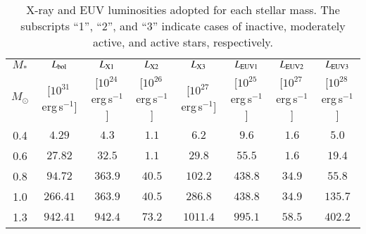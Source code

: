 \documentclass{aa}
\def\Mo{\ensuremath{M_{\odot}}}
\begin{document}
\begin{table*}
\caption{X-ray and EUV luminosities adopted for each stellar mass. The subscripts ``1'', ``2'', and ``3'' indicate cases of inactive, moderately active, and active stars, respectively.}
\label{tab:xuv}
\begin{center}
\begin{tabular}{c|c|c|c|c|c|c|c}
\hline
\hline
$M_*$ & $L_{\rm bol}$ & $L_{\rm X1}$ & $L_{\rm X2}$ & $L_{\rm X3}$ & $L_{\rm EUV1}$ & $L_{\rm EUV2}$ & $L_{\rm EUV3}$ \\
\Mo & [$10^{31}$\,erg\,s$^{-1}$] & [$10^{24}$\,erg\,s$^{-1}$] & [$10^{26}$\,erg\,s$^{-1}$] & [$10^{27}$\,erg\,s$^{-1}$] & [$10^{25}$\,erg\,s$^{-1}$] & [$10^{27}$\,erg\,s$^{-1}$] & [$10^{28}$\,erg\,s$^{-1}$] \\
  \hline
  0.4 & $4.29$   & $4.3$   & $1.1$  & $6.2$    & $9.6$    & $1.6$  & $5.0$ \\
  0.6 & $27.82$  & $32.5$  & $1.1$  & $29.8$   & $55.5$   & $1.6$  & $19.4$ \\
  0.8 & $94.72$  & $363.9$ & $40.5$ & $102.2$  & $438.8$  & $34.9$ & $55.8$ \\
  1.0 & $266.41$ & $363.9$ & $40.5$ & $286.8$  & $438.8$  & $34.9$ & $135.7$ \\
  1.3 & $942.41$ & $942.4$ & $73.2$ & $1011.4$ & $995.1$  & $58.5$ & $402.2$ \\
  \hline
\end{tabular}
\end{center}
\end{table*}
\end{document}
